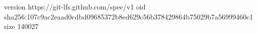 version https://git-lfs.github.com/spec/v1
oid sha256:107c9ac2eaad0cdbd09685372b8ed629c56b378429864b75029b7a56999460c1
size 140027
